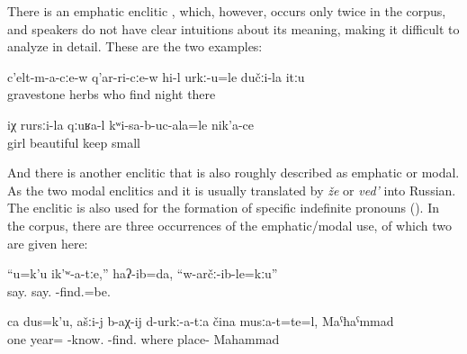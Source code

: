 There is an emphatic enclitic , which, however, occurs only twice in the corpus, and speakers do not have clear intuitions about its meaning, making it difficult to analyze in detail. These are the two examples:
%
\begin{exe}
	\ex	\label{ex:Among the graves, in the grass, who finds (him), at night minor}
	\gll	c'elt-m-a-cːe-w	q'ar-ri-cːe-w	hi-l	urkː-u=le	dučːi-la	itːu\\
		gravestone	herbs	who	find night	there\\
	\glt	{}

	\ex	\label{ex:‎(Look at) the way the girl is holding the child in her hands minor}
	\gll	iχ	rursːi-la qːuʁa-l	kʷi-sa-b-uc-ala=le	nik'a-ce\\
			girl	beautiful	keep	small\\
	\glt	{}
\end{exe}

And there is another enclitic  that is also roughly described as emphatic or modal. As the two modal enclitics  and  it is usually translated by \textit{že} or \textit{ved'} into Russian. The enclitic is also used for the formation of specific indefinite pronouns (). In the corpus, there are three occurrences of the emphatic/modal use, of which two are given here:
  
\begin{exe}
	\ex	\label{I said, ``You said that they did not find him.''}
	\gll	``u=k'u	ik'ʷ-a-tːe,''	haʔ-ib=da,	``w-arčː-ib-le=kːu'' \\
			say.	say.		-find.=be. \\
	\glt	{}
	
		\ex	\label{One year, you should know it, where the places were, Mahammad.}
	\gll	ca	dus=k'u,	ašːi-j	b-aχ-ij	d-urkː-a-tːa	čina	musːa-t=te=l,	Maˁħaˁmmad\\
		one	year=		-know.	-find.		where	place-	Mahammad\\
	\glt	{}

\end{exe}


